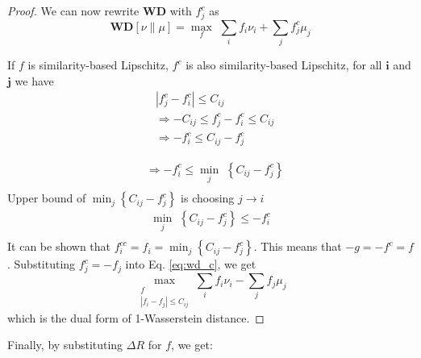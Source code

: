 \begin{proof}
We can now rewrite $\textbf{WD}$ with $f^c_j$ as
\begin{equation}\label{eq:wd_c}
\textbf{WD}[\nu \| \mu]=\max _{f}\,\, \sum_i f_i \nu_i+\sum_j f^c_j \mu_j
\end{equation}


If $f$ is similarity-based Lipschitz, $f^c$ is also similarity-based Lipschitz, for all $\boldsymbol{i}$ and $\boldsymbol{j}$ we have
\begin{equation*}\label{cons4}
\begin{aligned}
& \left|f^c_j-f^c_i\right| \leq C_{ij} \\
& \Longrightarrow-C_{ij} \leq f^c_j-f^c_i \leq C_{ij} \\
& \Longrightarrow-f^c_i \leq C_{ij}-f^c_j
\end{aligned}
\end{equation*}


\begin{equation*}
\begin{aligned}
& \Longrightarrow-f^c_i \leq \min _{j}\,\,\left\{C_{ij}-f^c_j\right\} \\
\end{aligned}
\end{equation*}
Upper bound of $\min _{j}\left\{C_{ij}-f^c_j\right\}$ is choosing $j \rightarrow i$
\begin{equation*}
\begin{aligned}
\min_{j}\,\,\left\{C_{ij}-f^c_j\right\} \leq-f^c_i \\
\end{aligned}
\end{equation*}
It can be shown that $f^{c c}_{i}=f_{i} = \min _{j}\left\{C_{ij}-f^c_j\right\}$. 
This means that $-g=-f^c = f$.
Substituting $f^c_j=-f_j$ into Eq. \ref{eq:wd_c}, we get
\begin{equation}\label{eq:maxmin2}
\max_{\substack{f \\ |f_i-f_j| \leq C_{ij}}} \sum_i f_i\nu_i-\sum_{j} f_j\mu_j
\end{equation}
which is the dual form of 1-Wasserstein distance. 

\end{proof}
Finally, by substituting $\Delta R$ for $f$, we get:
